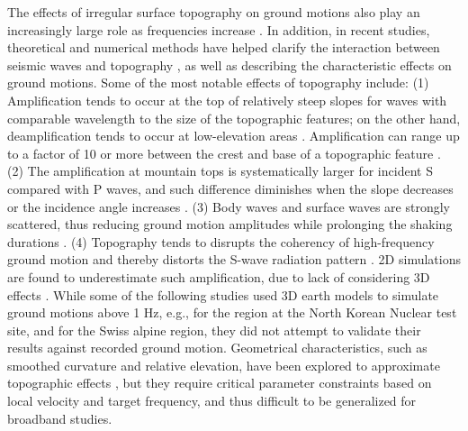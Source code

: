 The effects of irregular surface topography on ground motions also play an increasingly large role as frequencies increase . In addition, in recent studies, theoretical and numerical methods have helped clarify the interaction between seismic waves and topography \citep[mainly scattering and trapping of waves, e.g.,][]{imperatoriRoleTopographyLateral2015,takemura2015scattering}, as well as describing the characteristic effects on ground motions. Some of the most notable effects of topography include: (1) Amplification tends to occur at the top of relatively steep slopes for waves with comparable wavelength to the size of the topographic features; on the other hand, deamplification tends to occur at low-elevation areas \citep{trifunacAnalysisPacoimaDam1971,booreNoteEffectSimple1972,spudichDirectionalTopographicSite1996,bouchonSeismicResponseHill1996,assimakiSoilDependentTopographicEffects2005}. Amplification can range up to a factor of 10 or more between the crest and base of a topographic feature \citep{davisObservedEffectsTopography1973,geliEffectTopographyEarthquake1988,umedaHighAccelerationsProduced1987,gaffetSiteEffectStudy2000}. (2) The amplification at mountain tops is systematically larger for incident S compared with P waves, and such difference diminishes when the slope decreases or the incidence angle increases \citep{bardDiffractedWavesDisplacement1982}. (3) Body waves and surface waves are strongly scattered, thus reducing ground motion amplitudes while prolonging the shaking durations \citep{sanchez-sesmaDiffractionSVRayleigh1991,leeEffectsRealisticSurface2009}. (4) Topography tends to disrupts the coherency of high-frequency ground motion and thereby distorts the S-wave radiation pattern \citep{imperatoriRoleTopographyLateral2015}. 2D simulations are found to underestimate such amplification, due to lack of considering 3D effects \citep{geliEffectTopographyEarthquake1988,bouchonSeismicResponseHill1996}. While some of the following studies used 3D earth models to simulate ground motions above 1 Hz, e.g., \citet{rodgersBroadband04Hz2018} for the region at the North Korean Nuclear test site, and \citet{imperatoriRoleTopographyLateral2015} for the Swiss alpine region, they did not attempt to validate their results against recorded ground motion. Geometrical characteristics, such as smoothed curvature and relative elevation, have been explored to approximate topographic effects , but they require critical parameter constraints based on local velocity and target frequency, and thus difficult to be generalized for broadband studies.

